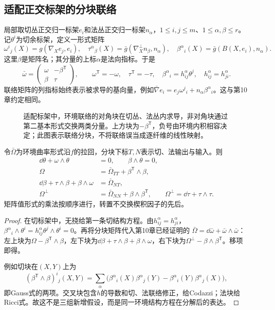 \subsection*{适配正交标架的分块联络}
局部取切丛正交归一标架$e_i$和法丛正交归一标架$n_\alpha$，$1\leq i,j\leq m$、$1\leq\alpha,\beta\leq r$。记$\theta^i$为切余标架，定义一形式矩阵
\[
 \omega^i{}_j(X)=g(\nabla_Xe_j,e_i),\quad
 \tau^\alpha{}_\beta(X)=\bar g(\nabla_X^\perp n_\beta,n_\alpha),\quad
 \beta^\alpha{}_i(X)=\bar g(B(X,e_i),n_\alpha).
\]
这里$\beta$是矩阵名；其分量的上标$\alpha$是法向指标。于是
\[
 \bar\omega=\begin{pmatrix}\omega&-\beta^{\mathsf T}\\
                   \beta&\tau\end{pmatrix},\qquad
 \omega^{\mathsf T}=-\omega,\quad\tau^{\mathsf T}=-\tau,
 \quad\beta^\alpha{}_i=h^\alpha_{ij}\theta^j,
 \quad h^\alpha_{ij}=h^\alpha_{ji}.
\]
联络矩阵的列指标始终表示被求导的基向量，例如$\bar\nabla e_i=e_j\omega^j{}_i+n_\alpha\beta^\alpha{}_i$。这与第10章约定相同。

\begin{figure}[htbp]
\centering
\caption{适配标架中，环境联络的对角块在切丛、法丛内求导，非对角块通过第二基本形式交换两类分量。上方块为$-\beta^{\mathsf T}$，负号由环境内积相容决定；此图表示联络分块，不将联络误当成逐纤维的线性映射。}
\label{fig:adapted-frame-block}
\end{figure}

\begin{proposition}[结构方程的三块]\label{prop:adapted-structure-equations}
令$\bar\Omega$为环境曲率形式沿$f$的拉回，分块下标$T,N$表示切、法输出与输入。则
\begin{align*}
 \dd\theta+\omega\wedge\theta&=0,\qquad \beta\wedge\theta=0,\\
 \Omega&=\bar\Omega_{TT}+\beta^{\mathsf T}\wedge\beta,\\
 \dd\beta+\tau\wedge\beta+\beta\wedge\omega&=\bar\Omega_{NT},\\
 \Omega^\perp&=\bar\Omega_{NN}+\beta\wedge\beta^{\mathsf T},
 \qquad\Omega^\perp=\dd\tau+\tau\wedge\tau.
\end{align*}
矩阵值形式的乘法按顺序进行，转置不交换楔积因子的先后。
\end{proposition}
\begin{proof}
在切标架中，无挠给第一条切结构方程。由$h^\alpha_{ij}=h^\alpha_{ji}$，
$\beta^\alpha{}_i\wedge\theta^i=h^\alpha_{ij}\theta^j\wedge\theta^i=0$。再将分块矩阵代入第10章已经证明的
$\bar\Omega=\dd\bar\omega+\bar\omega\wedge\bar\omega$：左上块为$\Omega-\beta^{\mathsf T}\wedge\beta$，左下块为$\dd\beta+\tau\wedge\beta+\beta\wedge\omega$，右下块为$\Omega^\perp-\beta\wedge\beta^{\mathsf T}$。移项即得。

例如切块在$(X,Y)$上为
\[
 (\beta^{\mathsf T}\wedge\beta)^i{}_j(X,Y)
 =\sum_\alpha\bigl(\beta^\alpha{}_i(X)\beta^\alpha{}_j(Y)
                 -\beta^\alpha{}_i(Y)\beta^\alpha{}_j(X)\bigr),
\]
即Gauss式的两项。交叉块包含$h$的导数和切、法联络修正，给Codazzi；法块给Ricci式。故这不是三组新增假设，而是同一环境结构方程在分解后的表达。
\end{proof}


